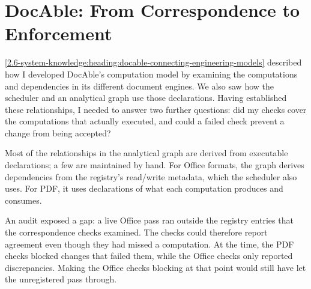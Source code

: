 \section{DocAble: From Correspondence to Enforcement}\label{heading:docable-from-correspondence-to-enforcement}



\cref{2.6-system-knowledge:heading:docable-connecting-engineering-models} described how I developed DocAble's computation model by examining the computations and dependencies in its different document engines. We also saw how the scheduler and an analytical graph use those declarations. Having established these relationships, I needed to answer two further questions: did my checks cover the computations that actually executed, and could a failed check prevent a change from being accepted?

Most of the relationships in the analytical graph are derived from executable declarations; a few are maintained by hand. For Office formats, the graph derives dependencies from the registry's read/write metadata, which the scheduler also uses. For PDF, it uses declarations of what each computation produces and consumes.

An audit exposed a gap: a live Office pass ran outside the registry entries that the correspondence checks examined. The checks could therefore report agreement even though they had missed a computation. At the time, the PDF checks blocked changes that failed them, while the Office checks only reported discrepancies. Making the Office checks blocking at that point would still have let the unregistered pass through.

